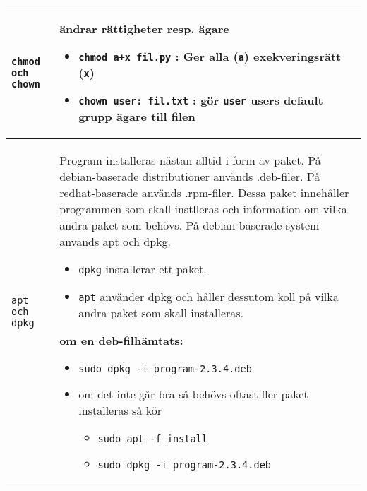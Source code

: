 \documentclass[a4paper]{article}
\begin{document}
\begin{longtable}{l|l}
    \midrule
  \begin{minipage}[t]{0.2\textwidth} 
    \texttt{chmod och chown}
  \end{minipage}
  &
  \begin{minipage}[t]{0.8\textwidth} 
    ändrar rättigheter resp. ägare

    \begin{itemize}
    \item \texttt{chmod a+x fil.py} : Ger alla (\texttt{a})
      exekveringsrätt (\texttt{x})
    \item \texttt{chown user: fil.txt} : gör \texttt{user} users
      default grupp ägare till filen
    \end{itemize}
  \end{minipage}
  \\
  \midrule
  \begin{minipage}[t]{0.2\textwidth} 
    \texttt{apt och dpkg}
  \end{minipage}
  &
  \begin{minipage}[t]{0.8\textwidth} 
Program installeras n\"astan alltid i form av paket. P{\aa} debian-baserade
distributioner anv\"ands .deb-filer. P{\aa} redhat-baserade anv\"ands
.rpm-filer. Dessa paket inneh{\aa}ller programmen som skall instlleras och
information om vilka andra paket som beh\"ovs. P{\aa} debian-baserade system
anv\"ands apt och dpkg.

\begin{itemize}

\item
  \texttt{dpkg} installerar ett paket.
\item
  \texttt{apt} anv\"ander dpkg och h{\aa}ller dessutom koll p{\aa} vilka andra
  paket som skall installeras.
\end{itemize}

\textbf{om en deb-filh\"amtats:}

\begin{itemize}

\item
  \texttt{sudo dpkg -i program-2.3.4.deb}
\item
  om det inte g{\aa}r bra s{\aa} beh\"ovs oftast fler paket installeras s{\aa} k\"or

  \begin{itemize}
  
  \item
    \texttt{sudo apt -f install}
  \item
    \texttt{sudo dpkg -i program-2.3.4.deb}
  \end{itemize}
\end{itemize}


\end{minipage}
\end{longtable}
\end{document}
